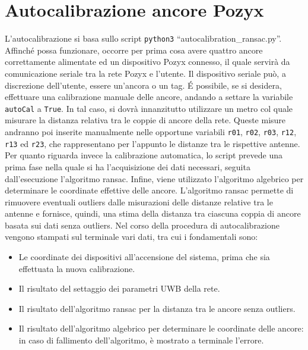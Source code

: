\newpage
\appendix
\section{Autocalibrazione ancore Pozyx}
\label{sez:Autocalibrazione}
L'autocalibrazione si basa sullo script \texttt{python3} ``autocalibration\_ransac.py''. 
Affinché possa funzionare, occorre per prima cosa avere quattro ancore correttamente alimentate ed un dispositivo Pozyx connesso, il quale servirà da comunicazione seriale tra la rete Pozyx e l’utente. 
Il dispositivo seriale può, a discrezione dell’utente, essere un’ancora o un tag. 
É possibile, se si desidera, effettuare una calibrazione manuale delle ancore, andando a settare la variabile \verb|autoCal| a \verb|True|. 
In tal caso, si dovrà innanzitutto utilizzare un metro col quale misurare la distanza relativa tra le coppie di ancore della rete. Queste misure andranno poi inserite manualmente  nelle opportune variabili \texttt{r01}, \texttt{r02}, \texttt{r03}, \texttt{r12}, \texttt{r13} ed \texttt{r23}, che rappresentano per l'appunto le distanze tra le rispettive antenne.
Per quanto riguarda invece la calibrazione automatica, lo script prevede una prima fase nella quale si ha l'acquisizione dei dati necessari, seguita dall'esecuzione l’algoritmo ransac. Infine, viene utilizzato l’algoritmo algebrico per determinare le coordinate effettive delle ancore. 
L’algoritmo ransac permette di rimuovere eventuali outliers dalle misurazioni delle distanze relative tra le antenne e fornisce, quindi, una stima della distanza tra ciascuna coppia di ancore basata sui dati senza outliers.
Nel corso della procedura di autocalibrazione vengono stampati sul terminale vari dati, tra cui i fondamentali sono:
\begin{itemize}
	\item Le coordinate dei dispositivi all’accensione del sistema, prima che sia effettuata la nuova calibrazione.
	
	\item Il risultato del settaggio dei parametri UWB della rete.
	
	\item Il risultato dell’algoritmo ransac per la distanza tra le ancore senza outliers.
	
	\item Il risultato dell'algoritmo algebrico per determinare le coordinate delle ancore: in caso di fallimento dell'algoritmo, è mostrato a terminale l'errore.
\end{itemize}

